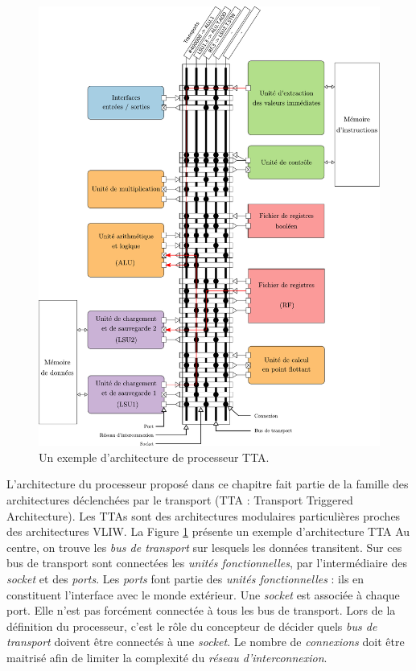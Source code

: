 \begin{figure}[htp]
\centering
\includegraphics[width=\textwidth]{main/ch4_fig/archi_tta}
\caption{Un exemple d'architecture de processeur TTA.}
\label{fig:tta_example}
\end{figure}

L'architecture du processeur proposé dans ce chapitre fait partie de la famille des architectures déclenchées par le transport (TTA : Transport Triggered Architecture). Les TTAs sont des architectures modulaires particulières proches des architectures VLIW. La Figure \ref{fig:tta_example} présente un exemple d'architecture TTA \cite{pekka_phd_2012} Au centre, on trouve les \textit{bus de transport} sur lesquels les données transitent. Sur ces bus de transport sont connectées les \textit{unités fonctionnelles}, par l'intermédiaire des \textit{socket} et des \textit{ports}. Les \textit{ports} font partie des \textit{unités fonctionnelles} : ils en constituent l'interface avec le monde extérieur. Une \textit{socket} est associée à chaque port. Elle n'est pas forcément connectée à tous les bus de transport. Lors de la définition du processeur, c'est le rôle du concepteur de décider quels \textit{bus de transport} doivent être connectés à une \textit{socket}. Le nombre de \textit{connexions} doit être maitrisé afin de limiter la complexité du \textit{réseau d'interconnexion}.

